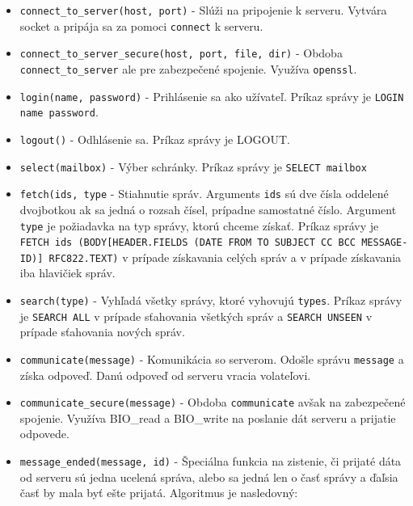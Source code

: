 \documentclass{article}
\begin{document}
\begin{itemize}
\item\texttt{connect\_to\_server(host, port)} - Slúži na pripojenie k serveru. Vytvára socket a pripája sa za pomoci \texttt{connect} k serveru.\\
\item\texttt{connect\_to\_server\_secure(host, port, file, dir)} - Obdoba \texttt{connect\_to\_server} ale pre zabezpečené spojenie. Využíva \texttt{openssl}.\\
\item\texttt{login(name, password)} - Prihlásenie sa ako užívateľ. Príkaz správy je \texttt{LOGIN name password}.\\
\item\texttt{logout()} - Odhlásenie sa. Príkaz správy je {LOGOUT}.\\
\item\texttt{select(mailbox)} - Výber schránky. Príkaz správy je \texttt{SELECT mailbox}\\
\item\texttt{fetch(ids, type} - Stiahnutie správ. Arguments \texttt{ids} sú dve čísla oddelené dvojbotkou ak sa jedná o rozsah čísel, prípadne samostatné číslo. Argument \texttt{type} je požiadavka na typ správy, ktorú chceme získať. Príkaz správy je \texttt{FETCH ids (BODY[HEADER.FIELDS (DATE FROM TO SUBJECT  CC BCC MESSAGE-ID)] RFC822.TEXT)} v prípade získavania celých správ a  v prípade získavania iba hlavičiek správ.\\
\item\texttt{search(type)} - Vyhľadá všetky správy, ktoré vyhovujú \texttt{types}. Príkaz správy je \texttt{SEARCH ALL} v prípade sťahovania všetkých správ a \texttt{SEARCH UNSEEN} v prípade sťahovania nových správ.\\
\item\texttt{communicate(message)} - Komunikácia so serverom. Odošle správu \texttt{message} a získa odpoveď. Danú odpoveď od serveru vracia volateľovi.\\
\item\texttt{communicate\_secure(message)} - Obdoba \texttt{communicate} avšak na zabezpečené spojenie. Využíva BIO\_read a BIO\_write na poslanie dát serveru a prijatie odpovede.\\
\item\texttt{message\_ended(message, id)} - Špeciálna funkcia na zistenie, či prijaté dáta od serveru sú jedna ucelená správa, alebo sa jedná len o časť správy a ďaľsia časť by mala byť ešte prijatá. Algoritmus je nasledovný:\\

\end{itemize}
\end{document}
